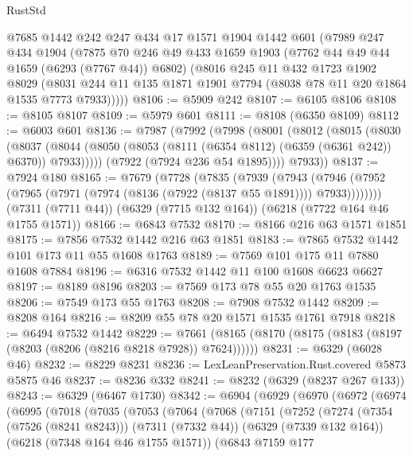 \begin{lexlean}{RustStd}
\begin{coremodule}
{{    @7685
    @1442
    @242
    @247
    @434
    @17
    @1571
    @1904
    @1442
    @601
    (@7989
      @247
      @434
      @1904
      (@7875
        @70
        @246
        @49
        @433
        @1659
        @1903
        (@7762 @44 @49 @44 @1659 (@6293 (@7767 @44)) @6802)
        (@8016
          @245
          @11
          @432
          @1723
          @1902
          @8029
          (@8031 @244 @11 @135 @1871 @1901 @7794 (@8038 @78 @11 @20 @1864 @1535 @7773 @7933)))))
@8106 := @5909 @242
@8107 := @6105 @8106
@8108 := @8105 @8107
@8109 := @5979 @601
@8111 := @8108 (@6350 @8109)
@8112 := @6003 @601
@8136 := @7987
    (@7992
      (@7998
        (@8001
          (@8012
            (@8015
              (@8030
                (@8037
                  (@8044 (@8050 (@8053 (@8111 (@6354 @8112) (@6359 (@6361 @242)) @6370)) @7933)))))
            (@7922 (@7924 @236 @54 @1895))))
        @7933))
@8137 := @7924 @180
@8165 := @7679
    (@7728
      (@7835
        (@7939
          (@7943 (@7946 (@7952 (@7965 (@7971 (@7974 (@8136 (@7922 (@8137 @55 @1891)))) @7933))))))))
    (@7311 (@7711 @44))
    (@6329 (@7715 @132 @164))
    (@6218 (@7722 @164 @46 @1755 @1571))
@8166 := @6843 @7532
@8170 := @8166 @216 @63 @1571 @1851
@8175 := @7856 @7532 @1442 @216 @63 @1851
@8183 := @7865 @7532 @1442 @101 @173 @11 @55 @1608 @1763
@8189 := @7569 @101 @175 @11 @7880 @1608 @7884
@8196 := @6316 @7532 @1442 @11 @100 @1608 @6623 @6627
@8197 := @8189 @8196
@8203 := @7569 @173 @78 @55 @20 @1763 @1535
@8206 := @7549 @173 @55 @1763
@8208 := @7908 @7532 @1442
@8209 := @8208 @164
@8216 := @8209 @55 @78 @20 @1571 @1535 @1761 @7918
@8218 := @6494 @7532 @1442
@8229 := @7661 (@8165 (@8170 (@8175 (@8183 (@8197 (@8203 (@8206 (@8216 @8218 @7928)) @7624))))))
@8231 := @6329 (@6028 @46)
@8232 := @8229 @8231
@8236 := LexLeanPreservation.Rust.covered @5873 @5875 @46
@8237 := @8236 @332
@8241 := @8232 (@6329 (@8237 @267 @133))
@8243 := @6329 (@6467 @1730)
@8342 := @6904
    (@6929
      (@6970
        (@6972
          (@6974
            (@6995
              (@7018
                (@7035
                  (@7053
                    (@7064
                      (@7068
                        (@7151
                          (@7252
                            (@7274
                              (@7354 (@7526 (@8241 @8243)))
                              (@7311 (@7332 @44))
                              (@6329 (@7339 @132 @164))
                              (@6218 (@7348 @164 @46 @1755 @1571))
                              (@6843
                                @7159
                                @177
}}
\end{coremodule}
\end{lexlean}
